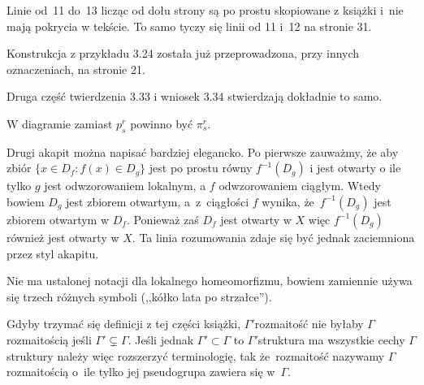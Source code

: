 \documentclass[a4paper,11pt]{article}
\begin{document}
\vspace{\spaceFour}


\start {} Linie od~11 do~13 licząc od dołu strony są po prostu
skopiowane z książki \cite{Gan04} i~nie mają pokrycia w tekście. To
samo tyczy się linii od 11 i~12 na stronie 31.

\vspace{\spaceFour}


\start {} Konstrukcja z przykładu 3.24 została już
przeprowadzona, przy innych oznaczeniach, na stronie 21.

\vspace{\spaceFour}


\start {} Druga część twierdzenia 3.33 i wniosek 3.34
stwierdzają dokładnie to samo.

\vspace{\spaceFour}


\start {} W diagramie zamiast $p^{ r }_{ s }$ powinno być
$\pi^{ r }_{ s }$.

\vspace{\spaceFour}


\start {} Drugi akapit można napisać bardziej elegancko. Po
pierwsze zauważmy, że aby zbiór \linebreak
$\{ x \in D_{ f } : f( x ) \in D_{ g } \}$ jest po prostu równy
$f^{ -1 }( D_{ g } )$ i jest otwarty o ile tylko $g$ jest
odwzorowaniem lokalnym, a $f$ odwzorowaniem ciągłym. Wtedy bowiem
$D_{ g }$ jest zbiorem otwartym, a~z~ciągłości $f$ wynika,
że~$f^{ -1 }( D_{ g } )$ jest zbiorem otwartym w $D_{ f }$. Ponieważ
zaś $D_{ f }$ jest otwarty w $X$ więc $f^{ -1 }( D_{ g } )$ również
jest otwarty w $X$. Ta linia rozumowania zdaje się być jednak
zaciemniona przez styl akapitu.

\vspace{\spaceFour}


\start {} Nie ma ustalonej notacji dla lokalnego homeomorfizmu,
bowiem zamiennie używa się trzech różnych symboli (,,kółko lata po
strzałce'').

\vspace{\spaceFour}


\start {} Gdyby trzymać się definicji z tej części książki,
$\Gamma'$\dywiz rozmaitość nie byłaby $\Gamma$\dywiz rozmaitością
jeśli $\Gamma' \subsetneq \Gamma$. Jeśli jednak
$\Gamma' \subset \Gamma$ to $\Gamma'$\dywiz struktura ma wszystkie
cechy $\Gamma$\dywiz struktury należy więc rozszerzyć terminologię,
tak że~rozmaitość nazywamy $\Gamma$\dywiz rozmaitością o~ile tylko jej
pseudogrupa zawiera się w~$\Gamma$.
\end{document}

